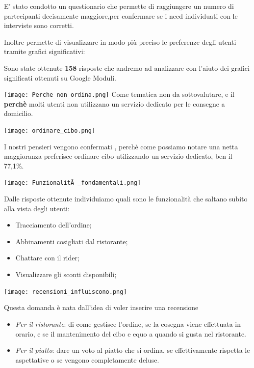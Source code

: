\documentclass{article}
\begin{document}
    \vspace{1cm}
 
     \par 
\par E' stato condotto un questionario che permette di raggiungere un numero di partecipanti decisamente maggiore,per confermare se i need individuati con le interviste sono corretti.\par Inoltre permette di visualizzare in modo più preciso le preferenze degli utenti tramite grafici significativi:
\par \vspace{1cm}
Sono state ottenute \textbf{158} risposte che andremo ad analizzare con l'aiuto dei grafici significati ottenuti su Google Moduli.\par 
\texttt{[image: Perche\_non\_ordina.png]}
Come tematica non da sottovalutare, e il \textbf{perchè} molti utenti non utilizzano un servizio dedicato per le consegne a domicilio.\vspace{1cm}\par
\texttt{[image: ordinare\_cibo.png]}\par
I nostri pensieri vengono confermati , perchè come possiamo notare una netta maggioranza preferisce ordinare cibo utilizzando un servizio dedicato, ben il 77,1\%.\par \vspace{1cm}
\texttt{[image: FunzionalitÃ \_fondamentali.png]}\par
Dalle risposte ottenute individuiamo quali sono le funzionalità che saltano subito alla vista degli utenti:
\par \begin{itemize}
    \item Tracciamento dell'ordine;
    \item Abbinamenti cosigliati dal ristorante;
    \item Chattare con il rider;
    \item Visualizzare gli sconti disponibili;
\end{itemize}   \vspace{1cm} \par
\texttt{[image: recensioni\_influiscono.png]}\par
Questa domanda è nata dall'idea di voler inserire una recensione 
    \begin{itemize}
        \item \textit{Per il ristorante}: di come gestisce l'ordine, se la cosegna viene effettuata in orario, e se il mantenimento del cibo e equo a quando si gusta nel ristorante.
        \item \textit{Per il piatto}: dare un voto al piatto che si ordina, se effettivamente rispetta le aspettative o se vengono completamente deluse.
    \end{itemize}
\end{document}
